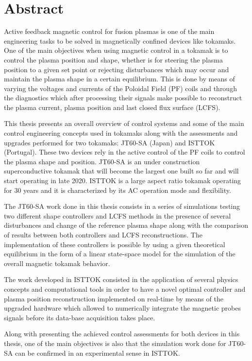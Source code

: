 \chapter*{Abstract}
Active feedback magnetic control for fusion plasmas is one of the main engineering tasks to be solved in magnetically  confined devices like tokamaks. One of the main objectives when using magnetic control in a tokamak is to control the plasma position and shape, whether is for steering the plasma position to a given set point or rejecting disturbances which may occur and maintain the plasma shape in a certain equilibrium. This is done by means of varying the voltages and currents of the  Poloidal Field (PF) coils and through the diagnostics which after processing their signals make possible to reconstruct the plasma current, plasma position and last closed flux surface (LCFS).
\smallskip

This thesis presents an overall overview of control systems and some of the main control engineering concepts used in tokamaks along with  the assessments and upgrades performed for two tokamaks: JT60-SA (Japan) and ISTTOK (Portugal). These two devices rely in the active control of the PF coils to control the plasma shape and position. JT60-SA is an under construction superconductive tokamak that will become the largest one built so far and will start operating in late 2020. ISTTOK is a large aspect ratio tokamak operating for 30 years and it is characterized by its AC operation mode and flexibility. \smallskip

The JT60-SA work done in this thesis consists in a series of simulations testing two different shape controllers and LCFS methods in the presence of several disturbances and change of the reference plasma shape along with the comparison of results between both controllers and LCFS reconstructions. The implementation of these controllers is possible by using a given theoretical equilibrium in the form of a linear state-space model for the simulation of the overall magnetic  tokamak behavior.\smallskip

 The work developed in ISTTOK consisted in the application of several physics concepts and computational tools in order to have a novel optimal controller and plasma position reconstruction implemented on real-time by means of the upgraded hardware which allowed to numerically integrate the magnetic probes signals before its data-base acquisition takes place. \smallskip
 
 Along with presenting the achieved control assessments for both devices in this thesis, one of the main objectives  is also that the simulation work done for JT60-SA can be confirmed in an experimental sense in ISTTOK. \smallskip


